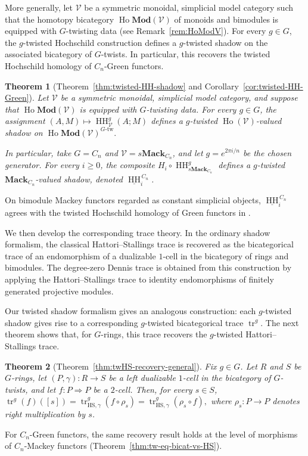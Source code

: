 \documentclass[11pt,oneside]{amsart}
\DeclareMathOperator{\Ho}{Ho}
\DeclareMathOperator{\HH}{HH}
\numberwithin{equation}{section}
\numberwithin{figure}{section}
\theoremstyle{plain}
\newtheorem{thm}{Theorem}[section]
\theoremstyle{definition}
\theoremstyle{remark}
\begin{document}
More generally, let \(\mathcal V\) be a symmetric monoidal, simplicial model category such that the homotopy bicategory \(\Ho\mathbf{Mod}(\mathcal V)\) of monoids and bimodules is equipped with \(G\)-twisting data (see Remark~\ref{rem:HoModV}). For every \(g\in G\), the \(g\)-twisted Hochschild construction defines a \(g\)-twisted shadow on the associated bicategory of \(G\)-twists. In particular, this recovers the twisted Hochschild homology of \(C_n\)-Green functors.

 
\begin{thm}[Theorem~\ref{thm:twisted-HH-shadow} and
Corollary~\ref{cor:twisted-HH-Green}]
Let \(\mathcal V\) be a symmetric monoidal, simplicial model category,
and suppose that \(\Ho\mathbf{Mod}(\mathcal V)\) is equipped with
\(G\)-twisting data. For every \(g\in G\), the assignment
\(
(A,M)\mapsto \HH^g_{\mathcal V}(A;M)
\)
defines a \(g\)-twisted \(\Ho(\mathcal V)\)-valued shadow on 
\(
\Ho\mathbf{Mod}(\mathcal V)^{G\text{-}\mathrm{tw}}.
\)

In particular, take \(G=C_n\) and
\(\mathcal V=s\mathbf{Mack}_{C_n}\), and let
\(g=e^{2\pi i/n}\) be the chosen generator. For every \(i\geq 0\), the
composite
\(
H_i\circ\HH^g_{s\mathbf{Mack}_{C_n}}
\)
defines a \(g\)-twisted \(\mathbf{Mack}_{C_n}\)-valued shadow, denoted
\(\underline{\HH}^{\,C_n}_i\).
\end{thm}

On bimodule Mackey functors regarded as constant simplicial objects,
\(\underline{\HH}^{\,C_n}_i\) agrees with the twisted Hochschild
homology of Green functors in \cite{BGHL,AGHKK}.




We then develop the corresponding trace theory. In the ordinary shadow formalism, the classical Hattori--Stallings trace is recovered as the bicategorical trace of an endomorphism of a dualizable \(1\)-cell in the bicategory of rings and bimodules. The degree-zero Dennis trace is obtained from this construction by applying the Hattori--Stallings trace to identity endomorphisms of finitely generated projective modules.


Our twisted shadow formalism gives an analogous construction: each
\(g\)-twisted shadow gives rise to a corresponding \(g\)-twisted
bicategorical trace \(\operatorname{tr}^g\). The next theorem shows that, for \(G\)-rings, this trace recovers the
\(g\)-twisted Hattori--Stallings trace.
\begin{thm}[Theorem~\ref{thm:twHS-recovery-general}]
Fix \(g\in G\). Let \(R\) and \(S\) be \(G\)-rings, let
\((P,\gamma)\colon R\to S\) be a left dualizable \(1\)-cell in the
bicategory of \(G\)-twists, and let \(f\colon P\Rightarrow P\) be a
\(2\)-cell. Then, for every \(s\in S\),
\(
\operatorname{tr}^g(f)([s])
=
\operatorname{tr}_{\mathrm{HS},\gamma}^g(f\circ\rho_s)
=
\operatorname{tr}_{\mathrm{HS},\gamma}^g(\rho_s\circ f),
\)
where \(\rho_s\colon P\to P\) denotes right multiplication by \(s\).
\end{thm}
For \(C_n\)-Green functors, the same recovery result holds at the
level of morphisms of \(C_n\)-Mackey functors
(Theorem~\ref{thm:tw-eq-bicat-vs-HS}).
 
\end{document}

